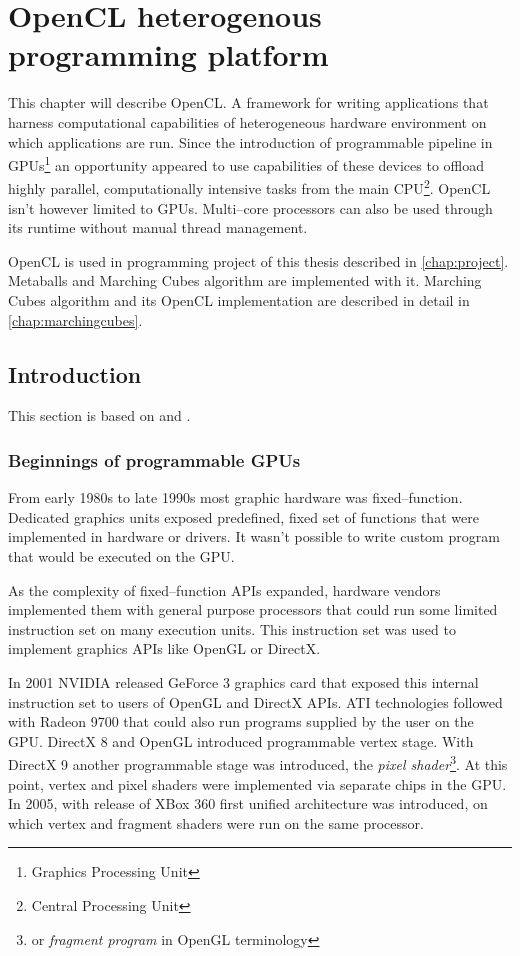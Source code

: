 \chapter{OpenCL heterogenous programming platform}
\label{chap:cl}
This chapter will describe OpenCL. A framework for writing applications that
harness computational capabilities of heterogeneous hardware environment on
which applications are run. Since the introduction of programmable pipeline
in GPUs\footnote{Graphics Processing Unit} an opportunity appeared to use
capabilities of these devices to offload highly parallel, computationally
intensive tasks from the main CPU\footnote{Central Processing Unit}. OpenCL
isn't however limited to GPUs. Multi--core processors can also be used through
its runtime without manual thread management.

OpenCL is used in programming project of this thesis described in \autoref{chap:project}.
Metaballs and Marching Cubes algorithm are implemented with it. Marching Cubes
algorithm and its OpenCL implementation are described in detail in
\autoref{chap:marchingcubes}.

\section{Introduction}
This section is based on \cite{Kirk:2010:PMP:1841511} and
\cite{gaster2012heterogeneous}.

\subsection{Beginnings of programmable GPUs}

From early 1980s to late 1990s most graphic hardware was fixed--function.
Dedicated graphics units exposed predefined, fixed set of functions that were
implemented in hardware or drivers. It wasn't possible to write custom program
that would be executed on the GPU.

As the complexity of fixed--function APIs expanded, hardware vendors implemented
them with general purpose processors that could run some limited instruction set
on many execution units. This instruction set was used to implement graphics APIs
like OpenGL or DirectX.

In 2001 NVIDIA released GeForce 3 graphics card that exposed this internal
instruction set to users of OpenGL and DirectX APIs. ATI technologies followed
with Radeon 9700 that could also run programs supplied by the user on the GPU.
DirectX 8 and OpenGL introduced programmable vertex stage. With
DirectX 9 another programmable stage was introduced, the \emph{pixel shader}\footnote{or \emph{fragment program} in
OpenGL terminology}. At this point, vertex and pixel shaders were
implemented via separate chips in the GPU. In 2005, with release of XBox 360
first unified architecture was introduced, on which vertex and fragment shaders
were run on the same processor.

